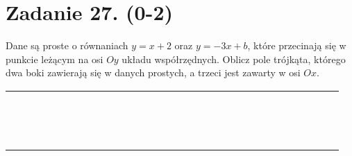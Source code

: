 \documentclass[10pt]{article}
\begin{document}
\section*{Zadanie 27. (0-2)}
Dane są proste o równaniach \(y=x+2\) oraz \(y=-3 x+b\), które przecinają się w punkcie leżącym na osi \(O y\) układu współrzędnych. Oblicz pole trójkąta, którego dwa boki zawierają się w danych prostych, a trzeci jest zawarty w osi \(O x\).

\begin{center}
\begin{tabular}{|c|c|c|c|c|c|c|c|c|c|c|c|c|c|c|c|c|c|c|c|c|c|c|c|c|c|c|c|c|c|}
\hline
 &  &  &  &  &  &  &  &  &  &  &  &  &  &  &  &  &  &  &  &  &  &  &  &  &  &  &  &  &  \\
\hline
 &  &  &  &  &  &  &  &  &  &  &  &  &  &  &  &  &  &  &  &  &  &  &  &  &  &  &  &  &  \\
\hline
 &  &  &  &  &  &  &  &  &  &  &  &  &  &  &  &  &  &  &  &  &  &  &  &  &  &  &  &  &  \\
\hline
 &  &  &  &  &  &  &  &  &  &  &  &  &  &  &  &  &  &  &  &  &  &  &  &  &  &  &  &  &  \\
\hline
 &  &  &  &  &  &  &  &  &  &  &  &  &  &  &  &  &  &  &  &  &  &  &  &  &  &  &  &  &  \\
\hline
 &  &  &  &  &  &  &  &  &  &  &  &  &  &  &  &  &  &  &  &  &  &  &  &  &  &  &  &  &  \\
\hline
 &  &  &  &  &  &  &  &  &  &  &  &  &  &  &  &  &  &  &  &  &  &  &  &  &  &  &  &  &  \\
\hline
 &  &  &  &  &  &  &  &  &  &  &  &  &  &  &  &  &  &  &  &  &  &  &  &  &  &  &  &  &  \\
\hline
 &  &  &  &  &  &  &  &  &  &  &  &  &  &  &  &  &  &  &  &  &  &  &  &  &  &  &  &  &  \\
\hline
 &  &  &  &  &  &  &  &  &  &  &  &  &  &  &  &  &  &  &  &  &  &  &  &  &  &  &  &  &  \\
\hline
 &  &  &  &  &  &  &  &  &  &  &  &  &  &  &  &  &  &  &  &  &  &  &  &  &  &  &  &  &  \\
\hline
 &  &  &  &  &  &  &  &  &  &  &  &  &  &  &  &  &  &  &  &  &  &  &  &  &  &  &  &  &  \\
\hline
 &  &  &  &  &  &  &  &  &  &  &  &  &  &  &  &  &  &  &  &  &  &  &  &  &  &  &  &  &  \\
\hline
 &  &  &  &  &  &  &  &  &  &  &  &  &  &  &  &  &  &  &  &  &  &  &  &  &  &  &  &  &  \\
\hline
 &  &  &  &  &  &  &  &  &  &  &  &  &  &  &  &  &  &  &  &  &  &  &  &  &  &  &  &  &  \\

\end{tabular}
\end{center}
\end{document}
